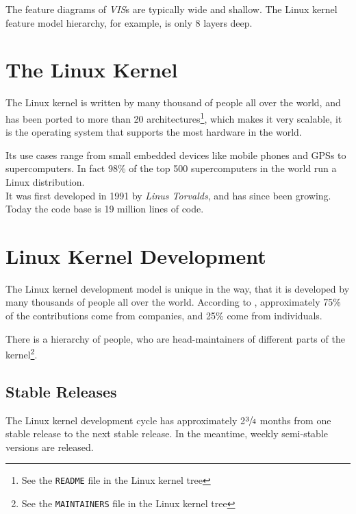 \documentclass[a4paper,11pt]{report}
\newcommand{\f}{\footnote{\fn}}
\newcommand{\textcode}[1]{\fboxsep=1pt\texttt{\colorbox{gray!20}{#1}}}
\begin{document}
The feature diagrams of \emph{VIS}s are typically wide and shallow. The Linux 
kernel feature model hierarchy, for example, is only 8 layers deep\cite[p. 
17]{VarModSSD}.


            
        \section{The Linux Kernel}

            \def \fn {See the \textcode{README} file in the Linux kernel tree}

The Linux kernel is written by many thousand of people all over 
the world, and has been ported to more than 20 architectures\f, which makes it 
very scalable, it is the operating system that supports the most hardware in
the world\cite{22thbirthday,gkh}.

Its use cases range from small embedded devices like mobile phones and GPSs to 
supercomputers. In fact 98\% of the top 500 supercomputers in the world run a 
Linux distribution\cite{top500}. 
\\

It was first developed in 1991 by \emph{Linus Torvalds}, and has since been 
growing. Today the code base is 19 million lines of code.


            \section{Linux Kernel Development}

            \def \fn {See the \textcode{MAINTAINERS} file in  
            the Linux kernel tree}

The Linux kernel development model is unique in the  way, that it is developed 
by many thousands of people all over the world. According to \cite{gkh}, 
approximately 75\% of the contributions come from companies, and 25\% come from 
individuals. 

There is a hierarchy of people, who are head-maintainers of different parts of 
the kernel\f.


            \subsection*{Stable Releases}

The Linux kernel development cycle has approximately 2$\sfrac{3}{4}$ months 
from one stable release to the next stable release\cite
    {crystalball}.
In the meantime, weekly semi-stable versions are released.
\end{document}

